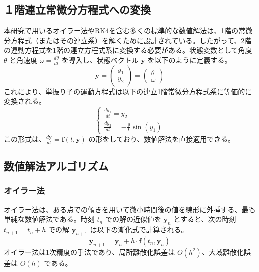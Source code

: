 \documentclass{article}
\begin{document}
\subsection{１階連立常微分方程式への変換}

本研究で用いるオイラー法やRK4を含む多くの標準的な数値解法は、1階の常微分方程式（またはその連立系）を解くために設計されている。したがって、2階の運動方程式を1階の連立方程式系に変換する必要がある。状態変数として角度 $\theta$ と角速度 $\omega = \frac{d\theta}{dt}$ を導入し、状態ベクトル $\mathbf{y}$ を以下のように定義する。
$$
\mathbf{y} =
\begin{pmatrix}
y_1 \\
y_2
\end{pmatrix}
=
\begin{pmatrix}
\theta \\
\omega
\end{pmatrix}
$$これにより、単振り子の運動方程式は以下の連立1階常微分方程式系に等価的に変換される。$$
\begin{cases}
\frac{dy_1}{dt} = y_2 \\
\frac{dy_2}{dt} = -\frac{g}{L}\sin(y_1)
\end{cases}
$$
この形式は、$\frac{d\mathbf{y}}{dt} = \mathbf{f}(t, \mathbf{y})$ の形をしており、数値解法を直接適用できる。

\subsection{数値解法アルゴリズム}

\subsubsection{オイラー法}
オイラー法は、ある点での傾きを用いて微小時間後の値を線形に外挿する、最も単純な数値解法である。時刻 $t_n$ での解の近似値を $\mathbf{y}_n$ とすると、次の時刻 $t_{n+1} = t_n + h$ での解 $\mathbf{y}_{n+1}$ は以下の漸化式で計算される。
$$\mathbf{y}_{n+1} = \mathbf{y}_n + h \cdot \mathbf{f}(t_n, \mathbf{y}_n)$$
オイラー法は1次精度の手法であり、局所離散化誤差は $O(h^2)$、大域離散化誤差は $O(h)$ である。
\end{document}
